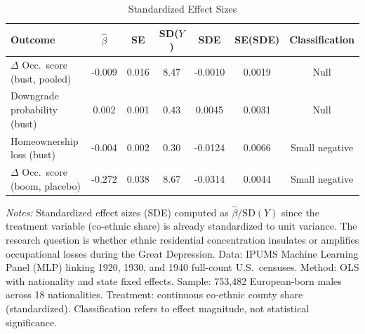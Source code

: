 \begin{table}[t]
\centering
\caption{Standardized Effect Sizes}
\label{tab:sde}
\small
\begin{tabular}{lcccccc}
\hline\hline
Outcome & $\hat{\beta}$ & SE & SD($Y$) & SDE & SE(SDE) & Classification \\
\hline
$\Delta$ Occ.\ score (bust, pooled) & -0.009 & 0.016 & 8.47 & -0.0010 & 0.0019 & Null \\
Downgrade probability (bust) & 0.002 & 0.001 & 0.43 & 0.0045 & 0.0031 & Null \\
Homeownership loss (bust) & -0.004 & 0.002 & 0.30 & -0.0124 & 0.0066 & Small negative \\
$\Delta$ Occ.\ score (boom, placebo) & -0.272 & 0.038 & 8.67 & -0.0314 & 0.0044 & Small negative \\
\hline\hline
\end{tabular}
\begin{minipage}{0.85\textwidth}\scriptsize
\textit{Notes:} Standardized effect sizes (SDE) computed as $\hat{\beta} / \text{SD}(Y)$ since the treatment variable (co-ethnic share) is already standardized to unit variance. The research question is whether ethnic residential concentration insulates or amplifies occupational losses during the Great Depression. Data: IPUMS Machine Learning Panel (MLP) linking 1920, 1930, and 1940 full-count U.S.\ censuses. Method: OLS with nationality and state fixed effects. Sample: 753,482 European-born males across 18 nationalities. Treatment: continuous co-ethnic county share (standardized). Classification refers to effect magnitude, not statistical significance.
\end{minipage}
\end{table}
